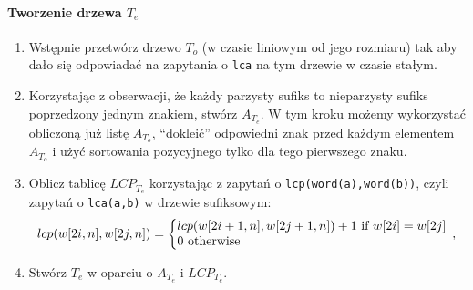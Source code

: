     \paragraph{Tworzenie drzewa $T_e$}
    \begin{enumerate}
     \item Wstępnie przetwórz drzewo $T_o$ (w czasie liniowym od jego rozmiaru) tak aby dało się odpowiadać na zapytania o \verb|lca| na tym drzewie w czasie stałym.
     \item Korzystając z obserwacji, że każdy parzysty sufiks to nieparzysty sufiks poprzedzony jednym znakiem, stwórz $A_{T_e}$. W tym kroku możemy wykorzystać obliczoną już listę $A_{T_o}$, ``dokleić'' odpowiedni znak przed każdym elementem $A_{T_o}$ i użyć sortowania pozycyjnego tylko dla tego pierwszego znaku.
     \item Oblicz tablicę $LCP_{T_e}$ korzystając z zapytań o \verb|lcp(word(a),word(b))|, czyli zapytań o \verb|lca(a,b)| w drzewie sufiksowym:
      \begin{align*}
      \left.
       lcp(w[2i,n],w[2j,n]) = \bigg\{
       \begin{array}{@{}l}
        lcp(w[2i+1,n],w[2j+1,n]) + 1 \text{ if } w[2i] = w[2j]   \\
        0 \text{ otherwise}
       \end{array},
        \right.              
      \end{align*}
      
      \item Stwórz $T_e$ w oparciu o $A_{T_e}$ i $LCP_{T_e}$.
    \end{enumerate}
    
